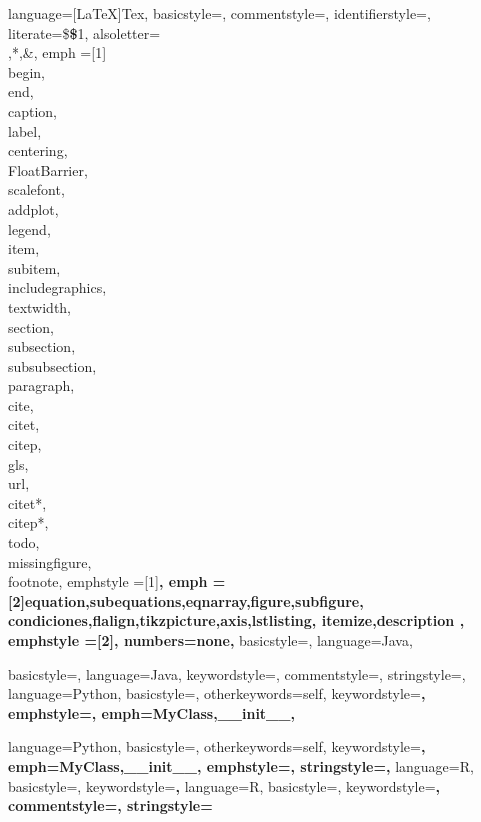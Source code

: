 	{
	language=[LaTeX]{Tex},
    basicstyle=\scriptsize,
    commentstyle=\color{dkgreen},
    identifierstyle=\color{black},
    literate={\$}{{{\bfseries\color{Dandelion}\$}}}1, %
    alsoletter={\\,*,\&},
    emph =[1]{\\begin,\\end,\\caption,\\label,\\centering,\\FloatBarrier,
              \,\\scalefont,\\addplot,\,
              \\legend,\\item,\\subitem,\\includegraphics,\\textwidth,
              \\section,\\subsection,\\subsubsection,\\paragraph,
              \\cite,\\citet,\\citep,\\gls,\,\\url,
              \\citet*,\\citep*,\\todo,\\missingfigure,\\footnote},
  	emphstyle =[1]\bfseries\color{RoyalBlue},
  	emph = [2]{equation,subequations,eqnarray,figure,subfigure,
  			   condiciones,flalign,tikzpicture,axis,lstlisting,
  			   itemize,description
  			   },
  	emphstyle =[2]\bfseries,
    numbers=none,
	}
{
	basicstyle=\scriptsize,
	language=Java,
}

{
	basicstyle=\scriptsize,
	language=Java,
  	keywordstyle=\color{blue},
  	commentstyle=\color{dkgreen},
  	stringstyle=\color{mauve},
}
{
	language=Python,
	basicstyle=\scriptsize,
	otherkeywords={self},  
	keywordstyle=\bfseries,     
	emphstyle=\bfseries,    
	emph={MyClass,__init__},         
}

{
	language=Python,
	basicstyle=\scriptsize,
	otherkeywords={self},          
	keywordstyle=\bfseries\color{deepblue},
	emph={MyClass,__init__},         
	emphstyle=\bfseries\color{deepred},    
	stringstyle=\color{deepgreen},
}
{
	language=R,                     
  	basicstyle=\scriptsize,
  	keywordstyle=\bfseries, 
}
{
	language=R,                     
  	basicstyle=\scriptsize,
  	keywordstyle=\bfseries\color{RoyalBlue}, 
  	commentstyle=\color{YellowGreen},
  	stringstyle=\color{ForestGreen}  
}

